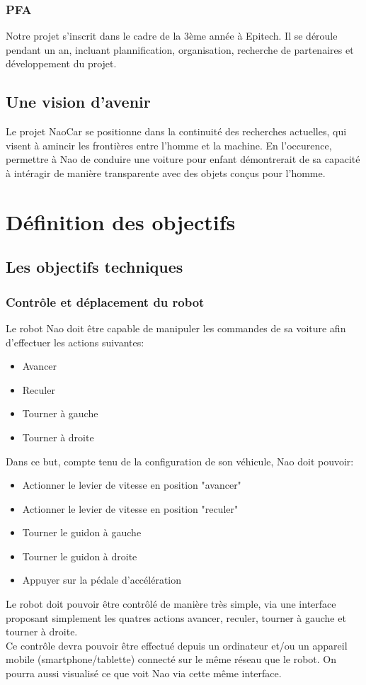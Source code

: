 \documentclass[11pt]{report} %
\begin{document}
		\subsection{PFA}
			Notre projet s'inscrit dans le cadre de la 3ème année à Epitech. Il se déroule pendant un an, incluant plannification, organisation, recherche de partenaires et développement du projet.\\
			
	\section{Une vision d'avenir}
			Le projet NaoCar se positionne dans la continuité des recherches actuelles, qui visent à amincir les frontières entre l'homme et la machine. En l'occurence, permettre à Nao de conduire une voiture pour enfant démontrerait de sa capacité à intéragir de manière transparente avec des objets conçus pour l'homme.
\chapter{Définition des objectifs}
	\section{Les objectifs techniques}
		\subsection{Contrôle et déplacement du robot}
			Le robot Nao doit être capable de manipuler les commandes de sa voiture afin d'effectuer les actions suivantes:
\begin{itemize}
\item Avancer
\item Reculer
\item Tourner à gauche
\item Tourner à droite
\end{itemize}
			Dans ce but, compte tenu de la configuration de son véhicule, Nao doit pouvoir:
\begin{itemize}
\item Actionner le levier de vitesse en position "avancer"
\item Actionner le levier de vitesse en position "reculer"
\item Tourner le guidon à gauche
\item Tourner le guidon à droite
\item Appuyer sur la pédale d'accélération
\end{itemize}
			Le robot doit pouvoir être contrôlé de manière très simple, via une interface proposant simplement les quatres actions avancer, reculer, tourner à gauche et tourner à droite.\\
			Ce contrôle devra pouvoir être effectué depuis un ordinateur et/ou un appareil mobile (smartphone/tablette) connecté sur le même réseau que le robot. On pourra aussi visualisé ce que voit Nao via cette même interface.
		\newpage
\end{document}
